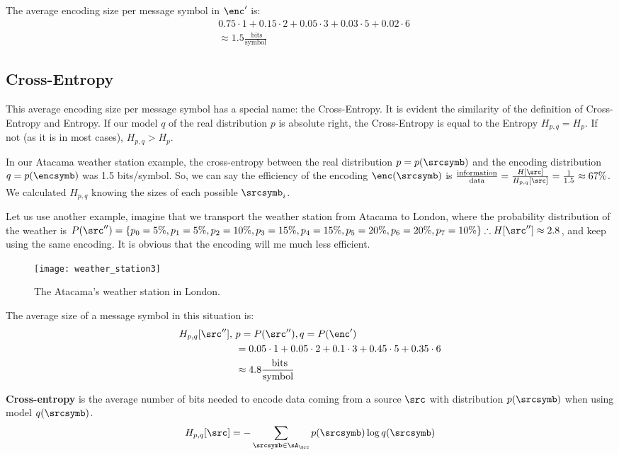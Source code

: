 The average encoding size per message symbol in \(\enc'\) is:
\begin{align}
	&0.75 \cdot 1 + 0.15 \cdot 2 + 0.05 \cdot 3 + 0.03 \cdot 5 + 0.02 \cdot 6 \nonumber \\
	&\approx 1.5 \frac{\text{ bits}}{\text{symbol}}
\end{align}

\subsection{Cross-Entropy}\label{sec:cross-entropy}
This average encoding size per message symbol has a special name: the Cross-Entropy. It is evident the similarity of the definition of Cross-Entropy and Entropy. If our model \(q\) of the real distribution \(p\) is absolute right, the Cross-Entropy is equal to the Entropy \(H_{p,q}=H_p\). If not (as it is in most cases), \(H_{p,q} > H_p \).

In our Atacama weather station example, the cross-entropy between the real distribution \(p=p(\srcsymb)\) and the encoding distribution \(q=p(\encsymb)\) was 1.5 bits/symbol. So, we can say the efficiency of the encoding \(\enc(\srcsymb)\) is \(\tfrac{\text{information}}{\text{data}} = \tfrac{H[\src]}{H_{p,q}[\src]} = \tfrac{1}{1.5} \approx 67\%\). We calculated  \(H_{p,q}\) knowing the sizes of each possible \(\srcsymb_i\).

Let us use another example, imagine that we transport the weather station from Atacama to London, where the probability distribution of the weather is \(P({\src''}) = \{p_0=5\%,p_1=5\%,p_2=10\%,p_3=15\%, p_4=15\%,p_5=20\%,p_6=20\%,p_7=10\% \} \therefore H[\src'']\approx 2.8\), and keep using the same encoding. It is obvious that the encoding will me much less efficient.
\begin{figure}
	[ht!] \centering
	\texttt{[image: weather\_station3]}
	\caption{The Atacama's weather station in London.}\label{fig:london} \end{figure}
The average size of a message symbol in this situation is:
\begin{align}
	H_{p,q}[\src''],~ &p = P(\src''), q = P(\enc') \\
	&= 0.05 \cdot 1 + 0.05 \cdot 2 + 0.1 \cdot 3 + 0.45 \cdot 5 + 0.35 \cdot 6 \nonumber \\
	&\approx 4.8 \frac{\text{ bits}}{\text{symbol}}
\end{align}
\begin{definition}
	\textbf{Cross-entropy} is the average number of bits needed to encode data coming from a source \(\src\) with distribution \(p(\srcsymb)\) when using model \(q(\srcsymb)\).
	\begin{align}
		H_{p,q}[\src]=-\sum_{\srcsymb \in \sA_{\src}} p(\srcsymb) \log q(\srcsymb)
	\end{align}
\end{definition}

